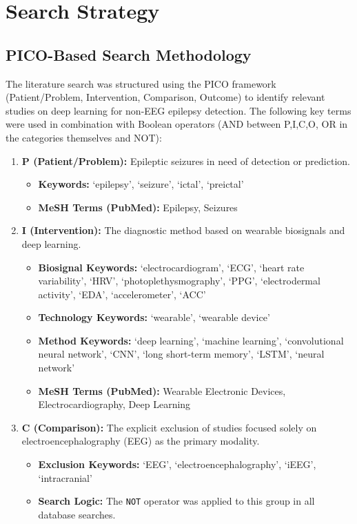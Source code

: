 \section{Search Strategy}
\label{sec:pico-search}

\subsection{PICO-Based Search Methodology}
The literature search was structured using the PICO framework 
(Patient/Problem, Intervention, Comparison, Outcome) 
to identify relevant studies on deep learning for non-EEG epilepsy
detection. The following key terms were used in combination with 
Boolean operators (AND between P,I,C,O, OR in the categories themselves and NOT):

\begin{enumerate}
    \item \textbf{P (Patient/Problem):} Epileptic seizures in need of detection or prediction.
    \begin{itemize}
        \item \textbf{Keywords:} `epilepsy', `seizure', `ictal', `preictal'
        \item \textbf{MeSH Terms (PubMed):} Epilepsy, Seizures
    \end{itemize}

    \item \textbf{I (Intervention):} The diagnostic method based on wearable biosignals and deep learning.
    \begin{itemize}
        \item \textbf{Biosignal Keywords:} `electrocardiogram', `ECG', `heart rate variability', `HRV', `photoplethysmography', `PPG', `electrodermal activity', `EDA', `accelerometer', `ACC'
        \item \textbf{Technology Keywords:} `wearable', `wearable device'
        \item \textbf{Method Keywords:} `deep learning', `machine learning', `convolutional neural network', `CNN', `long short-term memory', `LSTM', `neural network'
        \item \textbf{MeSH Terms (PubMed):} Wearable Electronic Devices, Electrocardiography, Deep Learning
    \end{itemize}

    \item \textbf{C (Comparison):} The explicit exclusion of studies focused solely on electroencephalography (EEG) as the primary modality.
    \begin{itemize}
        \item \textbf{Exclusion Keywords:} `EEG', `electroencephalography', `iEEG', `intracranial'
        \item \textbf{Search Logic:} The \texttt{NOT} operator was applied to this group in all database searches.
    \end{itemize}


\end{enumerate}
